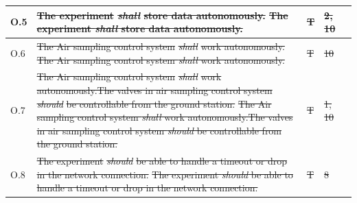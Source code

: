 \documentclass[a4paper,12pt,twoside]{article}
\providecommand{\DIFaddtex}[1]{{\protect\color{blue}\uwave{#1}}} %
\providecommand{\DIFdeltex}[1]{{\protect\color{red}\sout{#1}}}                      %
\providecommand{\DIFaddbegin}{} %
\providecommand{\DIFaddend}{} %
\providecommand{\DIFdelbegin}{} %
\providecommand{\DIFdelend}{} %
\providecommand{\DIFadd}[1]{\texorpdfstring{\DIFaddtex{#1}}{#1}} %
\providecommand{\DIFdel}[1]{\texorpdfstring{\DIFdeltex{#1}}{}} %
\newcommand{\DIFscaledelfig}{0.5}
\newlength{\DIFdelgraphicswidth} %
\newlength{\DIFdelgraphicsheight} %
\newcommand{\DIFaddincludegraphics}[2][]{{\color{blue}\fbox{\DIFOincludegraphics[#1]{#2}}}} %
\newcommand{\DIFdelincludegraphics}[2][]{%
\sbox{\DIFdelgraphicsbox}{\DIFOincludegraphics[#1]{#2}}%
\settoboxwidth{\DIFdelgraphicswidth}{\DIFdelgraphicsbox} %
\settoboxtotalheight{\DIFdelgraphicsheight}{\DIFdelgraphicsbox} %
\scalebox{\DIFscaledelfig}{%
\parbox[b]{\DIFdelgraphicswidth}{\usebox{\DIFdelgraphicsbox}\\[-\baselineskip] \rule{\DIFdelgraphicswidth}{0em}}\llap{\resizebox{\DIFdelgraphicswidth}{\DIFdelgraphicsheight}{%
\setlength{\unitlength}{\DIFdelgraphicswidth}%
\begin{picture}(1,1)%
\thicklines\linethickness{2pt} %
{\color[rgb]{1,0,0}\put(0,0){\framebox(1,1){}}}%
{\color[rgb]{1,0,0}\put(0,0){\line( 1,1){1}}}%
{\color[rgb]{1,0,0}\put(0,1){\line(1,-1){1}}}%
\end{picture}%
}\hspace*{3pt}}} %
} %
\DeclareRobustCommand{\DIFaddbegin}{\DIFOaddbegin \let\includegraphics\DIFaddincludegraphics} %
\DeclareRobustCommand{\DIFaddend}{\DIFOaddend \let\includegraphics\DIFOincludegraphics} %
\DeclareRobustCommand{\DIFdelbegin}{\DIFOdelbegin \let\includegraphics\DIFdelincludegraphics} %
\DeclareRobustCommand{\DIFdelend}{\DIFOaddend \let\includegraphics\DIFOincludegraphics} %
\begin{document}
\begin{longtable}[]{|m{}| m{} |m{} |m{}|m{}|}
O.5  & \DIFdelbegin \DIFdel{The experiment }\textit{\DIFdel{shall}} %
\DIFdel{store data autonomously.                                                                                                                }\DIFdelend \DIFaddbegin \st{The experiment \textit{shall} store data autonomously.}\DIFadd{\textsuperscript{\ref{fn:unnecessary-requirement}}                                                                                                                }\DIFaddend &       \DIFdelbegin \DIFdel{T       }\DIFdelend \DIFaddbegin \DIFadd{- }\DIFaddend & \DIFdelbegin \DIFdel{2, 10            }\DIFdelend \DIFaddbegin \DIFadd{-            }\DIFaddend &        \\ \hline
O.6  & \DIFdelbegin \DIFdel{The Air sampling control system }\textit{\DIFdel{shall}} %
\DIFdel{work autonomously.                                                                                                     }\DIFdelend \DIFaddbegin \st{The Air sampling control system \textit{shall} work autonomously.}\DIFadd{\textsuperscript{\ref{fn:unnecessary-requirement}}                                                                                                     }\DIFaddend &       \DIFdelbegin \DIFdel{T      }\DIFdelend \DIFaddbegin \DIFadd{-     }\DIFaddend &  \DIFdelbegin \DIFdel{10            }\DIFdelend \DIFaddbegin \DIFadd{-          }\DIFaddend &        \\ \hline
O.7  & \DIFdelbegin \DIFdel{The Air sampling control system }\textit{\DIFdel{shall}} %
\DIFdel{work autonomously.The valves in air sampling control system }\textit{\DIFdel{should}} %
\DIFdel{be controllable from the ground station. }\DIFdelend \DIFaddbegin \st{The Air sampling control system \textit{shall} work autonomously.The valves in air sampling control system \textit{should} be controllable from the ground station.}\DIFadd{\textsuperscript{\ref{fn:unnecessary-requirement}} }\DIFaddend &      \DIFdelbegin \DIFdel{T        }\DIFdelend \DIFaddbegin \DIFadd{-       }\DIFaddend &   \DIFdelbegin \DIFdel{1, 10            }\DIFdelend \DIFaddbegin \DIFadd{-         }\DIFaddend &        \\ \hline
O.8  & \DIFdelbegin \DIFdel{The experiment }\textit{\DIFdel{should}} %
\DIFdel{be able to handle a timeout or drop in the network connection.                                                                         }\DIFdelend \DIFaddbegin \st{The experiment \textit{should} be able to handle a timeout or drop in the network connection.}\DIFadd{\textsuperscript{\ref{fn:unnecessary-requirement}}                                                                         }\DIFaddend &    \DIFdelbegin \DIFdel{T          }\DIFdelend \DIFaddbegin \DIFadd{-         }\DIFaddend &  \DIFdelbegin \DIFdel{8           }\DIFdelend \DIFaddbegin \DIFadd{-  }\DIFaddend &        \\ \hline

\end{longtable}
\end{document}

